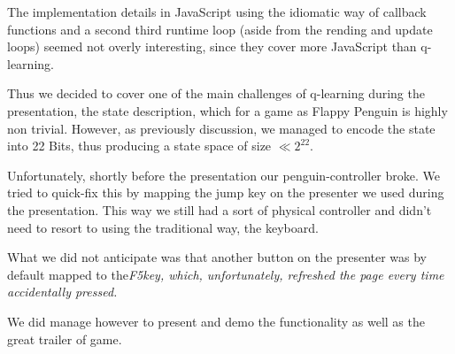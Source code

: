 \documentclass{article}
\begin{document}
        The implementation details in JavaScript using the idiomatic way of callback functions and a second third runtime loop (aside from the rending and update loops) seemed not overly interesting, since they cover more JavaScript than q-learning.

        Thus we decided to cover one of the main challenges of q-learning during the presentation, the state description, which for a game as Flappy Penguin is highly non trivial.
        However, as previously discussion, we managed to encode the state into 22 Bits, thus producing a state space of size $\ll 2^22$.

        Unfortunately, shortly before the presentation our penguin-controller broke. We tried to quick-fix this by mapping the jump key on the presenter we used during the presentation. This way we still had a sort of physical controller and didn't need to resort to using the traditional way, the keyboard.

        What we did not anticipate was that another button on the presenter was by default mapped to the\em F5\em key, which, unfortunately, refreshed the page every time accidentally pressed.

        We did manage however to present and demo the functionality as well as the great trailer of game.
\end{document}
